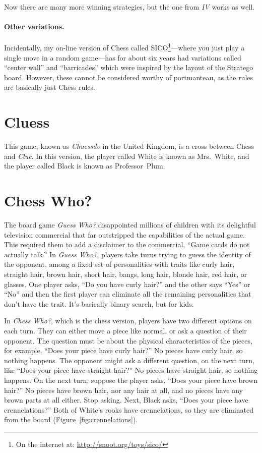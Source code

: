 \documentclass[twocolumn]{article}
\begin{document}
Now there are many more winning strategies, but the one from {\em IV}
works as well.

\paragraph{Other variations.} Incidentally, my on-line version of Chess 
called SICO\footnote{ On the internet at:
  \url{http://snoot.org/toys/sico/}}---where you just play a single
move in a random game---has for about six years had variations called
``center wall'' and ``barricades''\cite{sico} which were inspired by
the layout of the Stratego board. However, these cannot be considered
worthy of portmanteau, as the rules are basically just Chess rules.

\section{Cluess}

This game, known as {\em Chuessdo} in the United Kingdom, is a cross
between Chess and {\em Clue}. In this version, the player called White
is known as Mrs.~White, and the player called Black is known as
Professor~Plum.

\section{Chess Who?}

The board game {\em Guess Who?} disappointed millions of children with
its delightful television commercial that far outstripped the
capabilities of the actual game. This required them to add a
disclaimer to the commercial, ``Game cards do not actually talk.'' In
{\em Guess Who?}, players take turns trying to guess the identity of
the opponent, among a fixed set of personalities with traits like
curly hair, straight hair, brown hair, short hair, bangs, long hair,
blonde hair, red hair, or glasses. One player asks, ``Do you have
curly hair?'' and the other says ``Yes'' or ``No'' and then the first
player can eliminate all the remaining personalities that don't have
the trait. It's basically binary search, but for kids.

In {\em Chess Who?}, which is the chess version, players have two
different options on each turn. They can either move a piece like
normal, or ask a question of their opponent. The question must be
about the physical characteristics of the pieces, for example, ``Does
your piece have curly hair?'' No pieces have curly hair, so nothing
happens. The opponent might ask a different question, on the next turn,
like ``Does your piece have straight hair?'' No pieces have straight
hair, so nothing happens. On the next turn, suppose the player asks,
``Does your piece have brown hair?'' No pieces have brown hair,
nor any hair at all, and no pieces have any brown parts at all either.
Stop asking. Next, Black asks, ``Does your piece have crennelations?''
Both of White's rooks have crennelations, so they are eliminated from
the board (Figure~\ref{fig:crennelations}).
\end{document}
